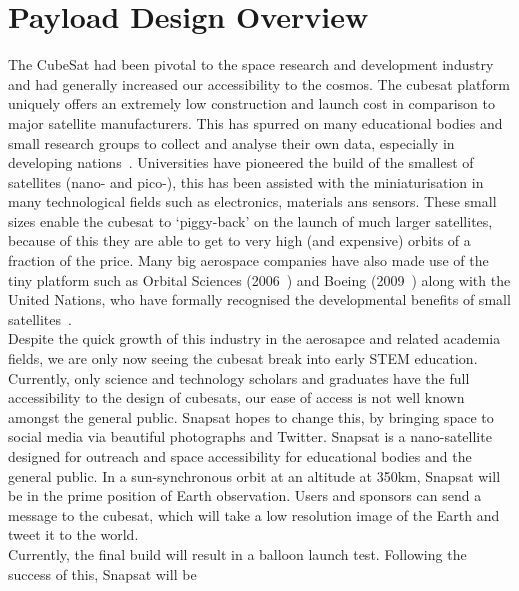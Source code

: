 \section{Payload Design Overview}
The CubeSat had been pivotal to the space research and development industry and had generally increased our accessibility to the cosmos. The cubesat platform uniquely offers an extremely low construction and launch cost in comparison to major satellite manufacturers. This has spurred on many educational bodies and small research groups to collect and analyse their own data, especially in developing nations~\cite{woeller}. Universities have pioneered the build of the smallest of satellites (nano- and pico-), this has been assisted with the miniaturisation in many technological fields such as electronics, materials ans sensors. These small sizes enable the cubesat to `piggy-back' on the launch of much larger satellites, because of this they are able to get to very high (and expensive) orbits of a fraction of the price. Many big aerospace companies have also made use of the tiny platform such as Orbital Sciences (2006~\cite{heidt}) and Boeing (2009~\cite{straub}) along with the United Nations, who have formally recognised the developmental benefits of small satellites~\cite{rycroft}. \\

\noindent
Despite the quick growth of this industry in the aerosapce and related academia fields, we are only now seeing the cubesat break into early STEM education. Currently, only science and technology scholars and graduates have the full accessibility to the design of cubesats, our ease of access is not well known amongst the general public. Snapsat hopes to change this, by bringing space to social media via beautiful photographs and Twitter. Snapsat is a nano-satellite designed for outreach and space accessibility for educational bodies and the general public. In a sun-synchronous orbit at an altitude at 350km, Snapsat will be in the prime position of Earth observation. Users and sponsors can send a message to the cubesat, which will take a low resolution image of the Earth and tweet it to the world. \\

\noindent
Currently, the final build will result in a balloon launch test. Following the success of this, Snapsat will be 